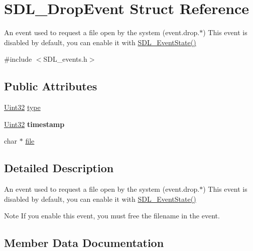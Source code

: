 \hypertarget{struct_s_d_l___drop_event}{}\section{S\+D\+L\+\_\+\+Drop\+Event Struct Reference}
\label{struct_s_d_l___drop_event}


An event used to request a file open by the system (event.\+drop.$\ast$) This event is disabled by default, you can enable it with \hyperlink{_s_d_l__events_8h_afb772893e1c46f186fa39a4defe76df3}{S\+D\+L\+\_\+\+Event\+State()}  




{\ttfamily \#include $<$S\+D\+L\+\_\+events.\+h$>$}

\subsection*{Public Attributes}
\begin{DoxyCompactItemize}
\item 
\hyperlink{_s_d_l__stdinc_8h_add440eff171ea5f55cb00c4a9ab8672d}{Uint32} \hyperlink{struct_s_d_l___drop_event_a5ea27cfaa5f8d4940e9a69b68b3cc035}{type}
\item 
\mbox{\label{struct_s_d_l___drop_event_a02d2c81bb22db632a40cd0021ff751ab}} 
\hyperlink{_s_d_l__stdinc_8h_add440eff171ea5f55cb00c4a9ab8672d}{Uint32} {\bfseries timestamp}
\item 
char $\ast$ \hyperlink{struct_s_d_l___drop_event_abc41ef4beb62e1d8b56827128b29585f}{file}
\end{DoxyCompactItemize}


\subsection{Detailed Description}
An event used to request a file open by the system (event.\+drop.$\ast$) This event is disabled by default, you can enable it with \hyperlink{_s_d_l__events_8h_afb772893e1c46f186fa39a4defe76df3}{S\+D\+L\+\_\+\+Event\+State()} 

\begin{DoxyNote}{Note}
If you enable this event, you must free the filename in the event. 
\end{DoxyNote}


\subsection{Member Data Documentation}
\mbox{\label{struct_s_d_l___drop_event_abc41ef4beb62e1d8b56827128b29585f}} 
